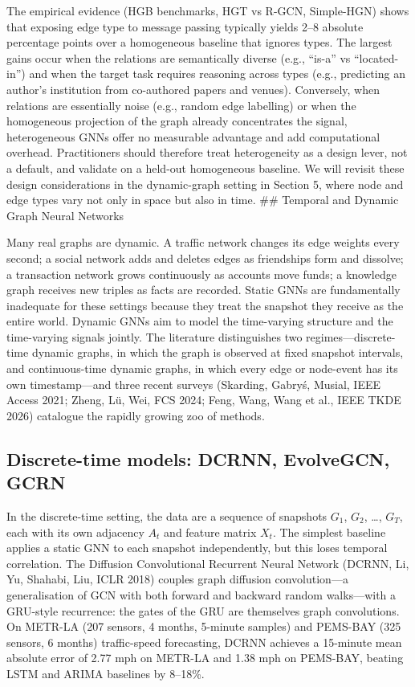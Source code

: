 The empirical evidence (HGB benchmarks, HGT vs R-GCN, Simple-HGN) shows that exposing edge type to message passing typically yields 2--8 absolute percentage points over a homogeneous baseline that ignores types. The largest gains occur when the relations are semantically diverse (e.g., ``is-a'' vs ``located-in'') and when the target task requires reasoning across types (e.g., predicting an author's institution from co-authored papers and venues). Conversely, when relations are essentially noise (e.g., random edge labelling) or when the homogeneous projection of the graph already concentrates the signal, heterogeneous GNNs offer no measurable advantage and add computational overhead. Practitioners should therefore treat heterogeneity as a design lever, not a default, and validate on a held-out homogeneous baseline. We will revisit these design considerations in the dynamic-graph setting in Section 5, where node and edge types vary not only in space but also in time.
\#\# Temporal and Dynamic Graph Neural Networks

Many real graphs are dynamic. A traffic network changes its edge weights every second; a social network adds and deletes edges as friendships form and dissolve; a transaction network grows continuously as accounts move funds; a knowledge graph receives new triples as facts are recorded. Static GNNs are fundamentally inadequate for these settings because they treat the snapshot they receive as the entire world. Dynamic GNNs aim to model the time-varying structure and the time-varying signals jointly. The literature distinguishes two regimes---discrete-time dynamic graphs, in which the graph is observed at fixed snapshot intervals, and continuous-time dynamic graphs, in which every edge or node-event has its own timestamp---and three recent surveys (Skarding, Gabryś, Musial, IEEE Access 2021; Zheng, Lü, Wei, FCS 2024; Feng, Wang, Wang et al., IEEE TKDE 2026) catalogue the rapidly growing zoo of methods.

\subsection{Discrete-time models: DCRNN, EvolveGCN, GCRN}\label{discrete-time-models-dcrnn-evolvegcn-gcrn}

In the discrete-time setting, the data are a sequence of snapshots \(G_1\), \(G_2\), \ldots, \(G_T\), each with its own adjacency \(A_t\) and feature matrix \(X_t\). The simplest baseline applies a static GNN to each snapshot independently, but this loses temporal correlation. The Diffusion Convolutional Recurrent Neural Network (DCRNN, Li, Yu, Shahabi, Liu, ICLR 2018) couples graph diffusion convolution---a generalisation of GCN with both forward and backward random walks---with a GRU-style recurrence: the gates of the GRU are themselves graph convolutions. On METR-LA (207 sensors, 4 months, 5-minute samples) and PEMS-BAY (325 sensors, 6 months) traffic-speed forecasting, DCRNN achieves a 15-minute mean absolute error of 2.77 mph on METR-LA and 1.38 mph on PEMS-BAY, beating LSTM and ARIMA baselines by 8--18\%.

